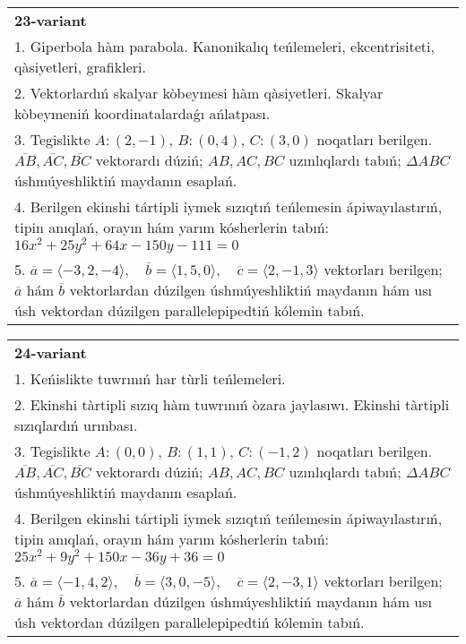 \documentclass{article}
\begin{document}
\begin{tabular}{m{17cm}}
\textbf{23-variant}\\
1. Giperbola hàm parabola. Kanonikalıq teńlemeleri, ekcentrisiteti, qàsiyetleri, grafikleri.\\

2. Vektorlardıń skalyar kòbeymesi hàm qàsiyetleri. Skalyar kòbeymeniń koordinatalardaǵı ańlatpası.\\

3. Tegislikte $A: (2, -1)$, $B: (0, 4)$, $C: (3, 0)$ noqatları berilgen. $\overline{AB}, \overline{AC}, \overline{BC}$ vektorardı dúziń; $AB, AC, BC$ uzınlıqlardı tabıń; $\Delta ABC$ úshmúyeshliktiń maydanın esaplań. \\

4. Berilgen ekinshi tártipli iymek sızıqtıń teńlemesin ápiwayılastırıń, tipin anıqlań, orayın hám yarım kósherlerin tabıń: $16x^2+25y^2+64x-150y-111=0$\\

5. \(\overline{a} = \langle -3, 2, -4 \rangle, \quad \overline{b} = \langle 1, 5, 0 \rangle, \quad \overline{c} = \langle 2, -1, 3 \rangle\) vektorları berilgen; \(\overline{a}\) hám \(\overline{b}\) vektorlardan dúzilgen úshmúyeshliktiń maydanın hám usı úsh vektordan dúzilgen parallelepipedtiń kólemin tabıń.
\end{tabular}
\vspace{1cm}


\begin{tabular}{m{17cm}}
\textbf{24-variant}\\
1. Keńislikte tuwrınıń har tùrli teńlemeleri. \\

2. Ekinshi tàrtipli sızıq hàm tuwrınıń òzara jaylasıwı. Ekinshi tàrtipli sızıqlardıń urınbası.\\

3. Tegislikte $A: (0, 0)$, $B: (1, 1)$, $C: (-1, 2)$ noqatları berilgen. $\overline{AB}, \overline{AC}, \overline{BC}$ vektorardı dúziń; $AB, AC, BC$ uzınlıqlardı tabıń; $\Delta ABC$ úshmúyeshliktiń maydanın esaplań. \\

4. Berilgen ekinshi tártipli iymek sızıqtıń teńlemesin ápiwayılastırıń, tipin anıqlań, orayın hám yarım kósherlerin tabıń: $25x^2+9y^2+150x-36y+36=0$\\

5. \(\overline{a} = \langle -1, 4, 2 \rangle, \quad \overline{b} = \langle 3, 0, -5 \rangle, \quad \overline{c} = \langle 2, -3, 1 \rangle\) vektorları berilgen; \(\overline{a}\) hám \(\overline{b}\) vektorlardan dúzilgen úshmúyeshliktiń maydanın hám usı úsh vektordan dúzilgen parallelepipedtiń kólemin tabıń.
\end{tabular}
\vspace{1cm}
\end{document}
